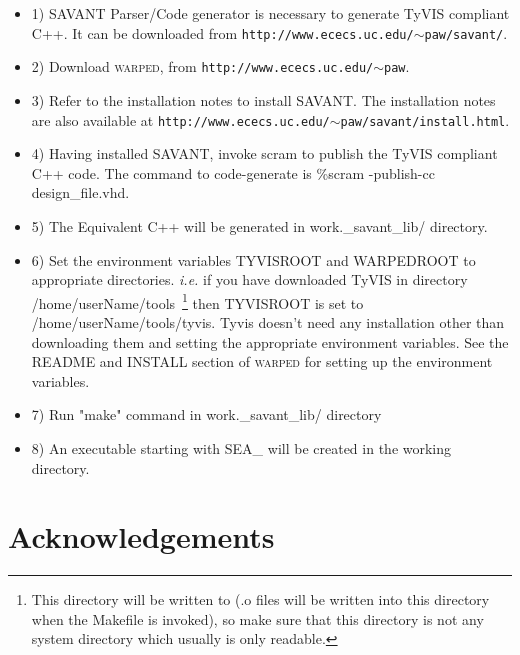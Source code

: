 \documentclass[11pt]{article}
\begin{document}
\begin{itemize}

\item 1) SAVANT Parser/Code generator is necessary to generate TyVIS
      compliant C++. It can be downloaded from
      \texttt{http://www.ececs.uc.edu/$\sim$paw/savant/}. 

\item 2) Download \textsc{warped}, from
         \texttt{http://www.ececs.uc.edu/$\sim$paw}.  

\item 3) Refer to the installation notes to install SAVANT. The
         installation notes are also available at
         \texttt{http://www.ececs.uc.edu/$\sim$paw/savant/install.html}. 

\item 4) Having installed SAVANT, invoke scram to publish the TyVIS
         compliant C++ code. The command to code-generate is \textsf{\%scram
         -publish-cc design\_file.vhd}.

\item 5) The Equivalent C++ will be generated in work.\_savant\_lib/
         directory.  

\item 6) Set the environment variables TYVISROOT and WARPEDROOT to
         appropriate directories. \emph{i.e.} if you have downloaded TyVIS
         in directory /home/userName/tools~\footnote{This directory will
         be written to (.o files will be written into this directory when
         the Makefile is invoked), so make sure that this directory is not
         any system directory which usually is only readable.} then
         TYVISROOT is set to /home/userName/tools/tyvis. Tyvis doesn't
         need any installation other than downloading them and setting the
         appropriate environment variables. See the README and INSTALL
         section of \textsc{warped} for setting up the environment
         variables.

\item 7) Run "make" command in work.\_savant\_lib/ directory

\item 8) An executable starting with SEA\_ will be created in the working 
         directory.

\end{itemize}

\section*{Acknowledgements}
\end{document}
